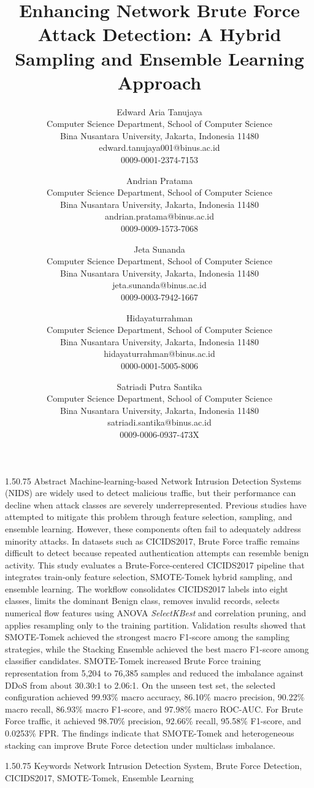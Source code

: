 \documentclass[12pt,a4paper]{article}
\title{Enhancing Network Brute Force Attack Detection: A Hybrid Sampling and Ensemble Learning Approach}
\author{
\fontsize{12}{14.4}\selectfont
Edward Aria Tanujaya\\
Computer Science Department, School of Computer Science\\
Bina Nusantara University, Jakarta, Indonesia 11480\\
edward.tanujaya001@binus.ac.id\\
0009-0001-2374-7153
\and
\fontsize{12}{14.4}\selectfont
Andrian Pratama\\
Computer Science Department, School of Computer Science\\
Bina Nusantara University, Jakarta, Indonesia 11480\\
andrian.pratama@binus.ac.id\\
0009-0009-1573-7068
\and
\fontsize{12}{14.4}\selectfont
Jeta Sunanda\\
Computer Science Department, School of Computer Science\\
Bina Nusantara University, Jakarta, Indonesia 11480\\
jeta.sunanda@binus.ac.id\\
0009-0003-7942-1667 
\and
\fontsize{12}{14.4}\selectfont
Hidayaturrahman\\
Computer Science Department, School of Computer Science\\
Bina Nusantara University, Jakarta, Indonesia 11480\\
hidayaturrahman@binus.ac.id\\
0000-0001-5005-8006
\and
\fontsize{12}{14.4}\selectfont
Satriadi Putra Santika\\
Computer Science Department, School of Computer Science\\
Bina Nusantara University, Jakarta, Indonesia 11480\\
satriadi.santika@binus.ac.id\\
0009-0006-0937-473X
}
\date{}
\makeatletter
\renewcommand{\section}{\@startsection{section}{1}{0pt}%
  {1.5\baselineskip}{0.75\baselineskip}%
  {\normalfont\fontsize{13}{15.6}\selectfont\bfseries}}
\makeatother
\begin{document}
\sloppy

\maketitle
\vspace{-5em}

\section{Abstract}
Machine-learning-based Network Intrusion Detection Systems (NIDS) are widely used to detect malicious traffic, but their performance can decline when attack classes are severely underrepresented. Previous studies have attempted to mitigate this problem through feature selection, sampling, and ensemble learning. However, these components often fail to adequately address minority attacks. In datasets such as CICIDS2017, Brute Force traffic remains difficult to detect because repeated authentication attempts can resemble benign activity. This study evaluates a Brute-Force-centered CICIDS2017 pipeline that integrates train-only feature selection, SMOTE-Tomek hybrid sampling, and ensemble learning. The workflow consolidates CICIDS2017 labels into eight classes, limits the dominant Benign class, removes invalid records, selects numerical flow features using ANOVA \textit{SelectKBest} and correlation pruning, and applies resampling only to the training partition. Validation results showed that SMOTE-Tomek achieved the strongest macro F1-score among the sampling strategies, while the Stacking Ensemble achieved the best macro F1-score among classifier candidates. SMOTE-Tomek increased Brute Force training representation from 5,204 to 76,385 samples and reduced the imbalance against DDoS from about 30.30:1 to 2.06:1. On the unseen test set, the selected configuration achieved 99.93\% macro accuracy, 86.10\% macro precision, 90.22\% macro recall, 86.93\% macro F1-score, and 97.98\% macro ROC-AUC. For Brute Force traffic, it achieved 98.70\% precision, 92.66\% recall, 95.58\% F1-score, and 0.0253\% FPR. The findings indicate that SMOTE-Tomek and heterogeneous stacking can improve Brute Force detection under multiclass imbalance.

\section{Keywords}
Network Intrusion Detection System, Brute Force Detection, CICIDS2017, SMOTE-Tomek, Ensemble Learning
\end{document}
